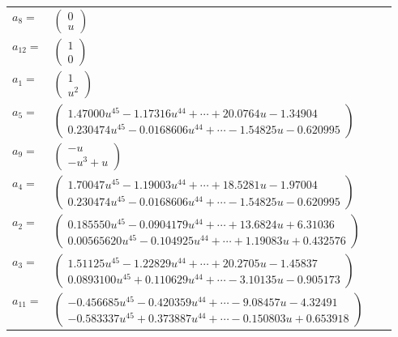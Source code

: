 \documentclass[1p]{elsarticle_modified}
\theoremstyle{definition}
\begin{document}
\begin{tabular}{m{7pt} m{180pt} m{7pt} m{180pt} }
\flushright $a_{8}=$&$\begin{pmatrix}0\\u\end{pmatrix}$ \\
\flushright $a_{12}=$&$\begin{pmatrix}1\\0\end{pmatrix}$ \\
\flushright $a_{1}=$&$\begin{pmatrix}1\\u^2\end{pmatrix}$ \\
\flushright $a_{5}=$&$\begin{pmatrix}1.47000 u^{45}-1.17316 u^{44}+\cdots+20.0764 u-1.34904\\0.230474 u^{45}-0.0168606 u^{44}+\cdots-1.54825 u-0.620995\end{pmatrix}$ \\
\flushright $a_{9}=$&$\begin{pmatrix}- u\\- u^3+u\end{pmatrix}$ \\
\flushright $a_{4}=$&$\begin{pmatrix}1.70047 u^{45}-1.19003 u^{44}+\cdots+18.5281 u-1.97004\\0.230474 u^{45}-0.0168606 u^{44}+\cdots-1.54825 u-0.620995\end{pmatrix}$ \\
\flushright $a_{2}=$&$\begin{pmatrix}0.185550 u^{45}-0.0904179 u^{44}+\cdots+13.6824 u+6.31036\\0.00565620 u^{45}-0.104925 u^{44}+\cdots+1.19083 u+0.432576\end{pmatrix}$ \\
\flushright $a_{3}=$&$\begin{pmatrix}1.51125 u^{45}-1.22829 u^{44}+\cdots+20.2705 u-1.45837\\0.0893100 u^{45}+0.110629 u^{44}+\cdots-3.10135 u-0.905173\end{pmatrix}$ \\
\flushright $a_{11}=$&$\begin{pmatrix}-0.456685 u^{45}-0.420359 u^{44}+\cdots-9.08457 u-4.32491\\-0.583337 u^{45}+0.373887 u^{44}+\cdots-0.150803 u+0.653918\end{pmatrix}$ \\

\end{tabular}
\end{document}
